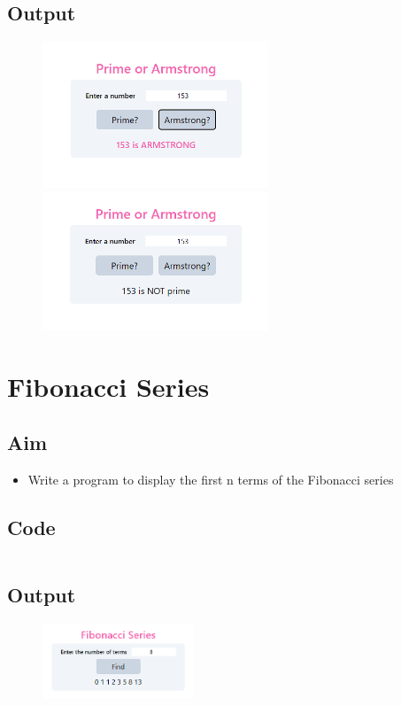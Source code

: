 \documentclass{article}
\begin{document}
\subsection{Output}
\begin{figure}[h!]
	\centering
	\includegraphics[width=0.6\textwidth]{./Assets/p0901.png}
	\includegraphics[width=0.6\textwidth]{./Assets/p0902.png}
\end{figure}
\newpage

\section{Fibonacci Series}
\subsection{Aim}
\begin{itemize}
	\item Write a program to display the first n terms of the Fibonacci series
\end{itemize}

\subsection{Code}
\inputminted[frame=lines, breaklines, breakanywhere, numberblanklines=false]{html}{./prog_10/index.html}

\subsection{Output}
\begin{figure}[h!]
	\centering
	\includegraphics[width=0.4\textwidth]{./Assets/p10.png}
\end{figure}
\newpage
\end{document}
